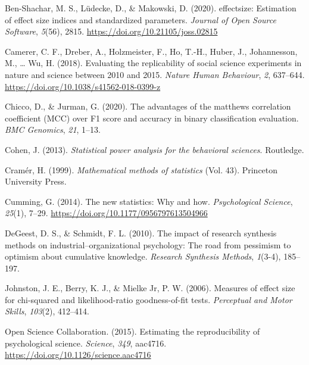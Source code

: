 \documentclass[
]{article}
\newlength{\cslhangindent}
\newlength{\cslentryspacingunit} %
\newenvironment{CSLReferences}[2] %
 {%
  \setlength{\parindent}{0pt}
  \ifodd #1
  \let\oldpar\par
  \def\par{\hangindent=\cslhangindent\oldpar}
  \fi
  \setlength{\parskip}{#2\cslentryspacingunit}
 }%
 {}
\begin{document}
\hypertarget{refs}{}
\begin{CSLReferences}{1}{0}
\leavevmode{}%
Ben-Shachar, M. S., Lüdecke, D., \& Makowski, D. (2020). {e}ffectsize:
Estimation of effect size indices and standardized parameters.
\emph{Journal of Open Source Software}, \emph{5}(56), 2815.
\url{https://doi.org/10.21105/joss.02815}

\leavevmode{}%
Camerer, C. F., Dreber, A., Holzmeister, F., Ho, T.-H., Huber, J.,
Johannesson, M., \ldots{} Wu, H. (2018). Evaluating the replicability of
social science experiments in nature and science between 2010 and 2015.
\emph{Nature Human Behaviour}, \emph{2}, 637--644.
\url{https://doi.org/10.1038/s41562-018-0399-z}

\leavevmode{}%
Chicco, D., \& Jurman, G. (2020). The advantages of the matthews
correlation coefficient (MCC) over F1 score and accuracy in binary
classification evaluation. \emph{BMC Genomics}, \emph{21}, 1--13.

\leavevmode{}%
Cohen, J. (2013). \emph{Statistical power analysis for the behavioral
sciences}. Routledge.

\leavevmode{}%
Cramér, H. (1999). \emph{Mathematical methods of statistics} (Vol. 43).
Princeton University Press.

\leavevmode{}%
Cumming, G. (2014). The new statistics: Why and how. \emph{Psychological
Science}, \emph{25}(1), 7--29.
\url{https://doi.org/10.1177/0956797613504966}

\leavevmode{}%
DeGeest, D. S., \& Schmidt, F. L. (2010). The impact of research
synthesis methods on industrial--organizational psychology: The road
from pessimism to optimism about cumulative knowledge. \emph{Research
Synthesis Methods}, \emph{1}(3-4), 185--197.

\leavevmode{}%
Johnston, J. E., Berry, K. J., \& Mielke Jr, P. W. (2006). Measures of
effect size for chi-squared and likelihood-ratio goodness-of-fit tests.
\emph{Perceptual and Motor Skills}, \emph{103}(2), 412--414.

\leavevmode{}%
Open Science Collaboration. (2015). Estimating the reproducibility of
psychological science. \emph{Science}, \emph{349}, aac4716.
\url{https://doi.org/10.1126/science.aac4716}


\end{CSLReferences}
\end{document}
